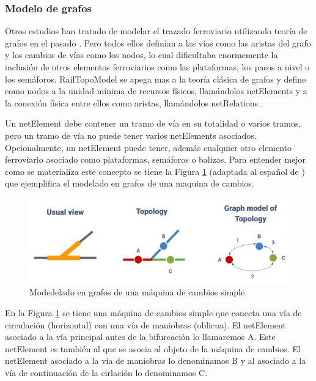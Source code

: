 \subsubsection{Modelo de grafos}
    \label{sec:RTM}
    
    Otros estudios han tratado de modelar el trazado ferroviario utilizando teoría de grafos en el pasado \cite{Paper_9,Paper_101,Paper_102,Paper_103}. Pero todos ellos definían a las vías como las aristas del grafo y los cambios de vías como los nodos, lo cual dificultaba enormemente la inclusión de otros elementos ferroviarios como las plataformas, los pasos a nivel o los semáforos. RailTopoModel se apega mas a la teoría clásica de grafos y define como nodos a la unidad mínima de recursos físicos, llamándolos netElements y a la conexión física entre ellos como aristas, llamándolos netRelations \cite{Paper_109}.

    Un netElement debe contener un tramo de vía en su totalidad o varios tramos, pero un tramo de vía no puede tener varios netElements asociados. Opcionalmente, un netElement puede tener, además cualquier otro elemento ferroviario asociado como plataformas, semáforos o balizas. Para entender mejor como se materializa este concepto se tiene la Figura \ref{fig:grafos_1} (adaptada al español de \cite{Paper_109}) que ejemplifica el modelado en grafos de una maquina de cambios.

    \begin{figure}[!h]
        \centering
        \includegraphics[width=1\textwidth]{Figuras/grafos}
        \centering\caption{Modedelado en grafos de una máquina de cambios simple.}
        \label{fig:grafos_1}
    \end{figure}

    En la Figura \ref{fig:grafos_1} se tiene una máquina de cambios simple que conecta una vía de circulación (horizontal) con una vía de maniobras (oblicua). El netElement asociado a la vía principal antes de la bifurcación lo llamaremos A. Este netElement es también al que se asocia al objeto de la máquina de cambios. El netElement asociado a la vía de maniobras lo denominamos B y al asociado a la vía de continuación de la cirlación lo denominamos C.

